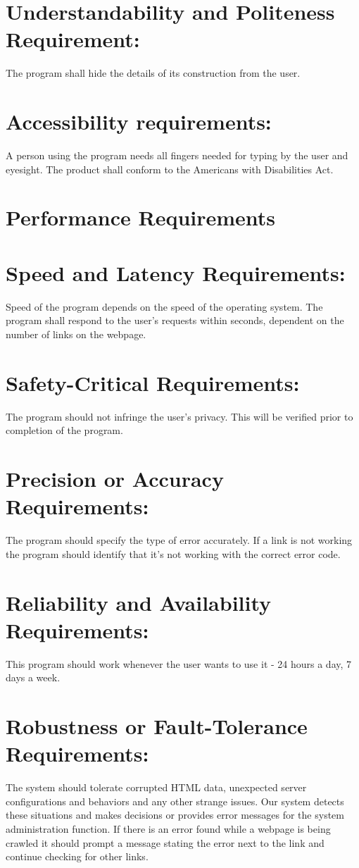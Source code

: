 \documentclass[12pt]{article}
\begin{document}
\section*{Understandability and Politeness Requirement: }The program shall hide the details of its construction from the user.

\section*{Accessibility requirements:} A person using the program needs all fingers needed for typing by the user and eyesight. The product shall conform to the Americans with Disabilities Act.

\section*{Performance Requirements }

\section*{Speed and Latency Requirements:}
Speed of the program depends on the speed of the operating system. The program shall respond to the user’s requests within seconds, dependent on the number of links on the webpage. 

\section*{Safety-Critical Requirements: }The program should not infringe the user’s privacy. 
This will be verified prior to completion of the program.



\section*{Precision or Accuracy Requirements:}
The program should specify the type of error accurately. If a link is not working the program should identify that it’s not working with the correct error code.

\section*{Reliability and Availability Requirements:}

This program should work whenever the user wants to use it - 24 hours a day, 7 days a week.

\section*{Robustness or Fault-Tolerance Requirements:}
The system should tolerate corrupted HTML data, unexpected server configurations and behaviors and any other strange issues. Our system detects these situations and makes decisions or provides error messages for the system administration function.
If there is an error found while a webpage is being crawled it should prompt a message stating the error next to the link and continue checking for other links.
\end{document}
